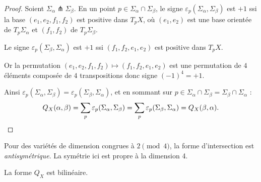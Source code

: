 \begin{proof}
Soient $\Sigma_\alpha \pitchfork \Sigma_\beta$. En un point $p \in \Sigma_\alpha \cap \Sigma_\beta$, le signe $\varepsilon_p(\Sigma_\alpha, \Sigma_\beta)$ est $+1$ ssi la base $(e_1, e_2, f_1, f_2)$ est positive dans $T_pX$, où $(e_1,e_2)$ est une base orientée de $T_p\Sigma_\alpha$ et $(f_1,f_2)$ de $T_p\Sigma_\beta$.

Le signe $\varepsilon_p(\Sigma_\beta, \Sigma_\alpha)$ est $+1$ ssi $(f_1, f_2, e_1, e_2)$ est positive dans $T_pX$.

Or la permutation $(e_1,e_2,f_1,f_2) \mapsto (f_1,f_2,e_1,e_2)$ est une permutation de $4$ éléments composée de $4$ transpositions donc signe $(-1)^4 = +1$.

Ainsi $\varepsilon_p(\Sigma_\alpha, \Sigma_\beta) = \varepsilon_p(\Sigma_\beta, \Sigma_\alpha)$, et en sommant sur $p \in \Sigma_\alpha \cap \Sigma_\beta = \Sigma_\beta \cap \Sigma_\alpha$ :
\[
  Q_X(\alpha,\beta) = \sum_p \varepsilon_p(\Sigma_\alpha,\Sigma_\beta) = \sum_p \varepsilon_p(\Sigma_\beta,\Sigma_\alpha) = Q_X(\beta,\alpha). \qedhere
\]
\end{proof}

\begin{remark}
Pour des variétés de dimension congrues à $2 \pmod 4$, la forme d'intersection est \emph{antisymétrique}. La symétrie ici est propre à la dimension 4.
\end{remark}

\begin{proposition}
\label{prop:bilinear}
La forme $Q_X$ est bilinéaire.
\end{proposition}

